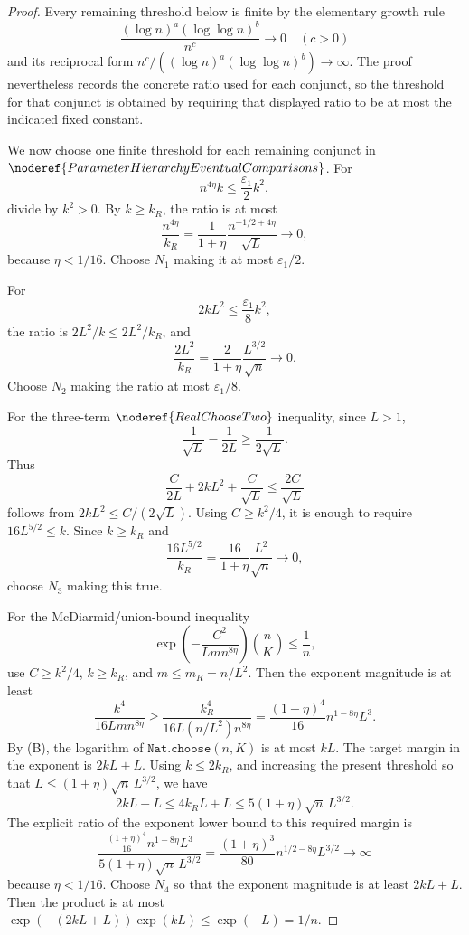\begin{proof}
Every remaining threshold below is finite by the elementary growth rule
\[
\frac{(\log n)^a(\log\log n)^b}{n^c}\to0
\quad(c>0)
\]
and its reciprocal form \(n^c/((\log n)^a(\log\log n)^b)\to\infty\).  The
proof nevertheless records the concrete ratio used for each conjunct, so the
threshold for that conjunct is obtained by requiring that displayed ratio to
be at most the indicated fixed constant.

We now choose one finite threshold for each remaining conjunct in
\(\noderef{ParameterHierarchyEventualComparisons}\).  For
\[
n^{4\eta}k\le \frac{\varepsilon_1}{2}k^2,
\]
divide by \(k^2>0\).  By \(k\ge k_R\), the ratio is at most
\[
\frac{n^{4\eta}}{k_R}
=\frac{1}{1+\eta}\frac{n^{-1/2+4\eta}}{\sqrt L}\to0,
\]
because \(\eta<1/16\).  Choose \(N_1\) making it at most
\(\varepsilon_1/2\).

For
\[
2kL^2\le \frac{\varepsilon_1}{8}k^2,
\]
the ratio is \(2L^2/k\le2L^2/k_R\), and
\[
\frac{2L^2}{k_R}=\frac{2}{1+\eta}\frac{L^{3/2}}{\sqrt n}\to0.
\]
Choose \(N_2\) making the ratio at most \(\varepsilon_1/8\).

For the three-term \(\noderef{RealChooseTwo}\) inequality, since \(L>1\),
\[
\frac{1}{\sqrt L}-\frac{1}{2L}\ge \frac{1}{2\sqrt L}.
\]
Thus
\[
\frac{C}{2L}+2kL^2+\frac{C}{\sqrt L}\le \frac{2C}{\sqrt L}
\]
follows from \(2kL^2\le C/(2\sqrt L)\).  Using \(C\ge k^2/4\), it is enough to
require \(16L^{5/2}\le k\).  Since \(k\ge k_R\) and
\[
\frac{16L^{5/2}}{k_R}
=\frac{16}{1+\eta}\frac{L^2}{\sqrt n}\to0,
\]
choose \(N_3\) making this true.

For the McDiarmid/union-bound inequality
\[
\exp\!\left(-\frac{C^2}{Lm n^{8\eta}}\right)\binom{n}{K}\le \frac1n,
\]
use \(C\ge k^2/4\), \(k\ge k_R\), and \(m\le m_R=n/L^2\).  Then the exponent
magnitude is at least
\[
\frac{k^4}{16Lm n^{8\eta}}
\ge
\frac{k_R^4}{16L(n/L^2)n^{8\eta}}
=\frac{(1+\eta)^4}{16}n^{1-8\eta}L^3.
\]
By (B), the logarithm of \(\texttt{Nat.choose}(n,K)\) is at most \(kL\).
The target margin in the exponent is \(2kL+L\).  Using \(k\le2k_R\), and
increasing the present threshold so that \(L\le(1+\eta)\sqrt n\,L^{3/2}\), we
have
\[
2kL+L\le4k_RL+L\le5(1+\eta)\sqrt n\,L^{3/2}.
\]
The explicit ratio of the exponent lower bound to this required margin is
\[
\frac{\frac{(1+\eta)^4}{16}n^{1-8\eta}L^3}
     {5(1+\eta)\sqrt n\,L^{3/2}}
=\frac{(1+\eta)^3}{80}n^{1/2-8\eta}L^{3/2}\to\infty
\]
because \(\eta<1/16\).  Choose \(N_4\) so that the exponent magnitude is at
least \(2kL+L\).  Then the product is at most
\(\exp(-(2kL+L))\exp(kL)\le \exp(-L)=1/n\).


\end{proof}
